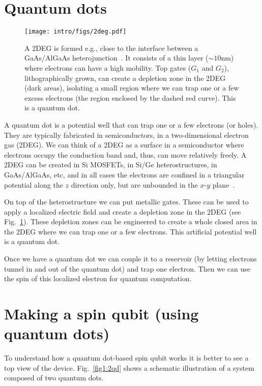 \section{Quantum dots}

\begin{figure}
  \centering
  \texttt{[image: intro/figs/2deg.pdf]}
  \caption{ A 2DEG is formed e.g., close to the interface between a GaAs/AlGaAs heterojunction~\cite{Hanson2007}. It consists of a thin layer ($\sim 10$nm) where electrons can have a high mobility. Top gates ($G_{1}$ and $G_{2}$), lithographically grown, can create a depletion zone in the 2DEG (dark areas), isolating a small region where we can trap one or a few excess electrons (the region enclosed by the dashed red curve). This is a quantum dot.  \label{fig1:2deg}}
\end{figure}

A quantum dot is a potential well that can trap one or a few electrons (or holes). They are typically fabricated in semiconductors, in a two-dimensional electron gas (2DEG). We can think of a 2DEG as a surface in a semiconductor where electrons occupy the conduction band and, thus, can move relatively freely. A 2DEG can be created in Si MOSFETs, in Si/Ge heterostructures, in GaAs/AlGaAs, etc, and in all cases the electrons are confined in a triangular potential along the $z$ direction only, but are unbounded in the $x$-$y$ plane~\cite{Hanson2007,Zwanenburg2013}.


On top of the heterostructure we can put metallic gates. These can be used to apply a localized electric field and create a depletion zone in the 2DEG (see Fig.~\ref{fig1:2deg}). These depletion zones can be engineered to create a whole closed area in the 2DEG where we can trap one or a few electrons. This artificial potential well is a quantum dot.

Once we have a quantum dot we can couple it to a reservoir (by letting electrons tunnel in and out of the quantum dot) and trap one electron. Then we can use the spin of this localized electron for quantum computation.




\section{Making a spin qubit (using quantum dots)}



To understand how a quantum dot-based spin qubit works it is better to see a top view of the device. Fig.~\ref{fig1:2qd} shows a schematic illustration of a system composed of two quantum dots.

